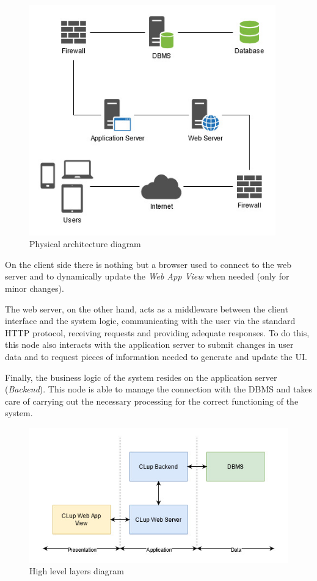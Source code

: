 \begin{figure}[H]
\centering
\includegraphics[width=0.95\textwidth]{assets/dd/architecture_overview/physical_architecture_diagram}
\caption{Physical architecture diagram}
\end{figure}

On the client side there is nothing but a browser used to connect to the web server and to dynamically update the \emph{Web App View} when needed (only for minor changes).

The web server, on the other hand, acts as a middleware between the client interface and the system logic, communicating with the user via the standard HTTP protocol, receiving requests and providing adequate responses. To do this, this node also interacts with the application server to submit changes in user data and to request pieces of information needed to generate and update the UI.

Finally, the business logic of the system resides on the application server (\emph{Backend}). This node is able to manage the connection with the DBMS and takes care of carrying out the necessary processing for the correct functioning of the system.

\begin{figure}[H]
\centering
\includegraphics{assets/dd/architecture_overview/high_level_layers}
\caption{High level layers diagram}
\end{figure}


